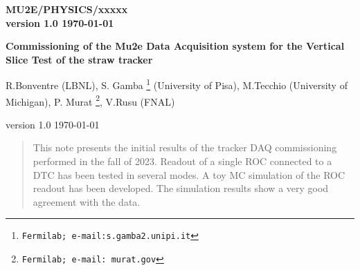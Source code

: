 \documentclass[12pt]{article}
\begin{document}
\begin{titlepage}
  \begin{flushright}
    \bf {MU2E/PHYSICS/xxxxx} \\
    version 1.0
    \today
 \end{flushright}

  \vspace{1cm}

  \begin{center}
    {\Large \bf Commissioning of the Mu2e Data Acquisition system for the Vertical Slice Test of the straw tracker

      \vspace{0.3in}

    }

    \vspace{1cm}
    R.Bonventre (LBNL),
    S. Gamba  \footnote{\texttt{Fermilab; e-mail:s.gamba2\@studenti.unipi.it}} (University of Pisa),
    M.Tecchio (University of Michigan),
    P. Murat \footnote{\texttt{Fermilab; e-mail: murat\@fnal.gov}},
    V.Rusu  (FNAL)

        version 1.0
    \today
 \end{center}

  \begin{abstract}
    This note presents the initial results of the tracker DAQ commissioning performed in the fall of 2023.
    Readout of a single ROC connected to a DTC has been tested in several modes. A toy MC simulation
    of the ROC readout has been developed. The simulation results show a very good agreement with the data.
    \vspace{0.2in}
  \end{abstract}

\end{titlepage}
%
%
%
{\tableofcontents}

% 

\newpage
\end{document}
